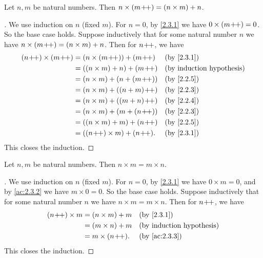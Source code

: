 \begin{ac}\label{ac:2.3.3}
  Let \(n, m\) be natural numbers.
  Then \(n \times (m\!+\!\!+) = (n \times m) + n\).
\end{ac}

\begin{proof}[]
  We use induction on \(n\) (fixed \(m\)).
  For \(n = 0\), by \cref{2.3.1} we have \(0 \times (m\!+\!\!+) = 0\).
  So the base case holds.
  Suppose inductively that for some natural number \(n\) we have \(n \times (m\!+\!\!+) = (n \times m) + n\).
  Then for \(n\!+\!\!+\), we have
  \begin{align*}
    (n\pp) \times (m\pp)
     & = (n \times (m\pp)) + (m\pp)  &  & \by{2.3.1} \\
     & = ((n \times m) + n) + (m\pp) &  & \byIH      \\
     & = (n \times m) + (n + (m\pp)) &  & \by{2.2.5} \\
     & = (n \times m) + ((n + m)\pp) &  & \by{2.2.3} \\
     & = (n \times m) + ((m + n)\pp) &  & \by{2.2.4} \\
     & = (n \times m) + (m + (n\pp)) &  & \by{2.2.3} \\
     & = ((n \times m) + m) + (n\pp) &  & \by{2.2.5} \\
     & = ((n\pp) \times m) + (n\pp). &  & \by{2.3.1}
  \end{align*}
  This closes the induction.
\end{proof}

\begin{lem}\label{2.3.2}
  Let \(n, m\) be natural numbers.
  Then \(n \times m = m \times n\).
\end{lem}

\begin{proof}[]
  We use induction on \(n\) (fixed \(m\)).
  For \(n = 0\), by \cref{2.3.1} we have \(0 \times m = 0\), and by \cref{ac:2.3.2} we have \(m \times 0 = 0\).
  So the base case holds.
  Suppose inductively that for some natural number \(n\) we have \(n \times m = m \times n\).
  Then for \(n\!+\!\!+\), we have
  \begin{align*}
    (n\pp) \times m & = (n \times m) + m &  & \by{2.3.1}    \\
                    & = (m \times n) + m &  & \byIH         \\
                    & = m \times (n\pp). &  & \by{ac:2.3.3}
  \end{align*}
  This closes the induction.
\end{proof}

